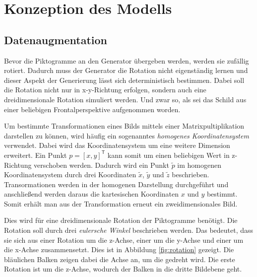\chapter{Konzeption des Modells}
\label{chap:konzept}







\section{Datenaugmentation}
\label{chap:3-datenaugmentation}
Bevor die Piktogramme an den Generator übergeben werden, werden sie zufällig rotiert. Dadurch muss der Generator die Rotation nicht eigenständig lernen und dieser Aspekt der Generierung lässt sich deterministisch bestimmen. Dabei soll die Rotation nicht nur in x-y-Richtung erfolgen, sondern auch eine dreidimensionale Rotation simuliert werden. Und zwar so, als sei das Schild aus einer beliebigen Frontalperspektive aufgenommen worden.

Um bestimmte Transformationen eines Bilds mittels einer Matrixpultiplikation darstellen zu können, wird häufig ein sogenanntes \emph{homogenes Koordinatensystem} verwendet. Dabei wird das Koordinatensystem um eine weitere Dimension erweitert. Ein Punkt $p = [x, y]^\mathsf{T}$ kann somit um einen beliebigen Wert in z-Richtung verschoben werden. Dadurch wird ein Punkt $\tilde{p}$ im homogenen Koordinatensystem durch drei Koordinaten $\tilde{x}$, $\tilde{y}$ und $\tilde{z}$ beschrieben. Transormationen werden in der homogenen Darstellung durchgeführt und anschließend werden daraus die kartesischen Koordinaten $x$ und $y$ bestimmt. Somit erhält man aus der Transformation erneut ein zweidimensionales Bild. \cite{geometric-ops} \cite{math-primer}

Dies wird für eine dreidimensionale Rotation der Piktogramme benötigt. Die Rotation soll durch drei \emph{eulersche Winkel} beschrieben werden. Das bedeutet, dass sie sich aus einer Rotation um die z-Achse, einer um die y-Achse und einer um die x-Achse zusammensetzt. Dies ist in Abbildung \ref{fig:rotation} gezeigt. Die bläulichen Balken zeigen dabei die Achse an, um die gedreht wird. Die erste Rotation ist um die z-Achse, wodurch der Balken in die dritte Bildebene geht. \cite{math-primer}


